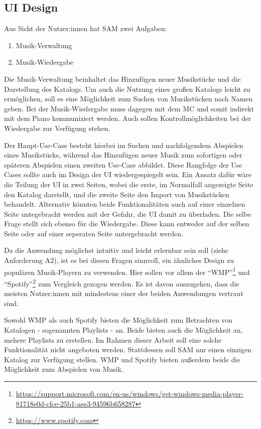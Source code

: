 \subsection{UI Design} \label{vorgehenSW-UI-design}

Aus Sicht der Nutzer:innen hat \ac{SAM} zwei Aufgaben:
\begin{enumerate}
    \item Musik-Verwaltung
    \item Musik-Wiedergabe
\end{enumerate}

Die Musik-Verwaltung beinhaltet das Hinzufügen neuer Musikstücke und die Darstellung des Katalogs.
Um auch die Nutzung eines großen Katalogs leicht zu ermöglichen, soll es eine Möglichkeit zum Suchen von Musikstücken nach Namen geben.
Bei der Musik-Wiedergabe muss dagegen mit dem \ac{MC} und somit indirekt mit dem Piano kommuniziert werden.
Auch sollen Kontrollmöglichkeiten bei der Wiedergabe zur Verfügung stehen.

Der Haupt-Use-Case besteht hierbei im Suchen und nachfolgendem Abspielen eines Musikstücks, während das Hinzufügen neuer Musik zum sofortigen oder späteren Abspielen einen zweiten Use-Case abbildet.
Diese Rangfolge der Use Cases sollte auch im Design der \ac{UI} wiedergespiegelt sein. \newline
Ein Ansatz dafür wäre die Teilung der \ac{UI} in zwei Seiten, wobei die erste, im Normalfall angezeigte Seite den Katalog darstellt, und die zweite Seite den Import von Musikstücken behandelt.
Alternativ könnten beide Funktionalitäten auch auf einer einzelnen Seite untegebracht werden mit der Gefahr, die \ac{UI} damit zu überladen. \newline
Die selbe Frage stellt sich ebenso für die Wiedergabe.
Diese kann entweder auf der selben Seite oder auf einer seperaten Seite untergebracht werden.

Da die Anwendung möglichst intuitiv und leicht erlernbar sein soll (siehe Anforderung A2), ist es bei diesen Fragen sinnvoll, ein ähnliches Design zu populären Musik-Playern zu verwenden.
Hier sollen vor allem der \enquote{\acf{WMP}}\footnote{\url{https://support.microsoft.com/en-us/windows/get-windows-media-player-81718e0d-cfce-25b1-aee3-94596b658287}} und \enquote{Spotify}\footnote{\url{https://www.spotify.com}} zum Vergleich gezogen werden.
Es ist davon auszugehen, dass die meisten Nutzer:innen mit mindestens einer der beiden Anwendungen vertraut sind.

Sowohl \ac{WMP} als auch Spotify bieten die Möglichkeit zum Betrachten von Katalogen - sogenannten Playlists - an.
Beide bieten auch die Möglichkeit an, mehere Playlists zu erstellen.
Im Rahmen dieser Arbeit soll eine solche Funktionalität nicht angeboten werden.
Stattdessen soll \ac{SAM} nur einen einzigen Katalog zur Verfügung stellen.
\ac{WMP} und Spotify bieten außerdem beide die Möglichkeit zum Abspielen von Musik.

